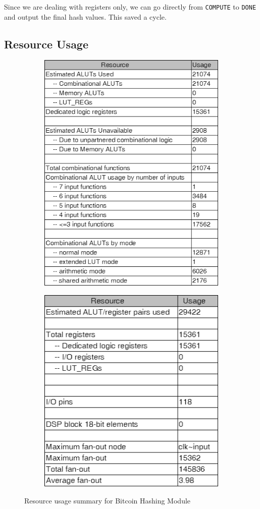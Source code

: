 \documentclass{article}
\begin{document}
Since we are dealing with registers only, we can go directly from \verb|COMPUTE| to \verb|DONE| and output the final hash values. This saved a cycle.




\subsection{Resource Usage}

\begin{figure}[H]
  \centering
  \begin{subfigure}
    \centering
    \includegraphics[width=0.45\linewidth]{r1.png}
  \end{subfigure}
  \begin{subfigure}
    \centering
    \includegraphics[width=0.45\linewidth]{r2.png}
  \end{subfigure}
  \caption{Resource usage summary for Bitcoin Hashing Module}
\end{figure}
\end{document}
